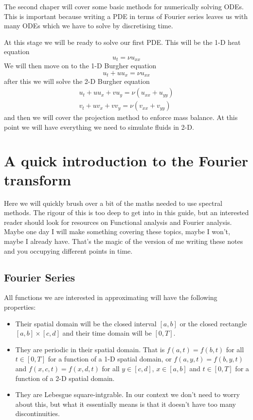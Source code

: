 \documentclass[a4paper,11pt]{article}
\theoremstyle{plain} %
\theoremstyle{remark}
\theoremstyle{definition} %
\begin{document}
The second chaper will cover some basic methods for numerically solving ODEs. This is important because writing a PDE in terms of Fourier series leaves us with many ODEs which we have to solve by discretising time.

At this stage we will be ready to solve our first PDE. This will be the 1-D heat equation
\begin{equation*}
u_t=\nu u_{xx}
\end{equation*}
We will then move on to the 1-D Burgher equation
\begin{equation}
u_t + u u_x = \nu u_{xx}
\end{equation}
after this we will solve the 2-D Burgher equation
\begin{align*}
u_t + u u_x +v u_y= \nu \left(u_{xx}+u_{yy}\right)\\
v_t + u v_x + v v_y= \nu\left(v_{xx}+v_{yy}\right)
\end{align*}
and then we will cover the projection method to enforce mass balance. At this point we will have everything we need to simulate fluids in 2-D.

\section{A quick introduction to the Fourier transform}

Here we will quickly brush over a bit of the maths needed to use spectral methods. The rigour of this is too deep to get into in this guide, but an interested reader should look for resources on Functional analysis and Fourier analysis. Maybe one day I will make something covering these topics, maybe I won't, maybe I already have. That's the magic of the version of me writing these notes and you occupying different points in time.

\subsection{Fourier Series}
All functions we are interested in approximating will have the following properties:
\begin{itemize}
	\item Their spatial domain will be the closed interval $[a,b]$ or the closed rectangle $[a,b]\times[c,d]$ and their time domain will be $[0,T]$.
	\item They are periodic in their spatial domain. That is $f(a,t)=f(b,t)$ for all $t\in [0,T]$ for a function of a 1-D spatial domain, or $f(a,y,t)=f(b,y,t)$ and $f(x,c,t)=f(x,d,t)$ for all $y\in[c,d]$, $x\in[a,b]$ and $t\in[0,T]$ for a function of a 2-D spatial domain.
	\item They are Lebesgue square-intgrable. In our context we don't need to worry about this, but what it essentially means is that it doesn't have too many discontinuities.
\end{itemize}
\end{document}
